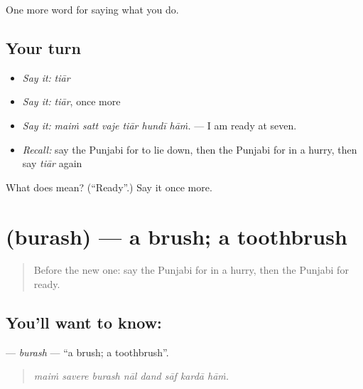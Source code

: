 \begin{grammarlens}[title={What you've built}]
One more word for saying what you do.
\end{grammarlens}

\subsection*{Your turn}
\begin{itemize}
\raggedright
  \item \emph{Say it:} \emph{tiār}
  \item \emph{Say it:} \emph{tiār}, once more
  \item \emph{Say it:} \emph{maiṁ satt vaje tiār hundī hāṁ.} — I am ready at seven.
  \item \emph{Recall:} say the Punjabi for to lie down, then the Punjabi for in a hurry, then say \emph{tiār} again
\end{itemize}

\begin{tcolorbox}[breakable,colback=teal!4,colframe=teal!35!black,title={Before you move on}]
What does  mean? (\textquotedblleft{}Ready\textquotedblright{}.) Say it once more.
\end{tcolorbox}
\section[\texorpdfstring{\pa{ਬੁਰਸ਼} (burash)}{ਬੁਰਸ਼ (burash)}]{ (burash) — a brush; a toothbrush}

\label{lesson:PA-C226-burash}



\begin{quote}
Before the new one: say the Punjabi for in a hurry, then the Punjabi for ready.
\end{quote}

\subsection*{You'll want to know: }
\textbf{} — \emph{burash} — \textquotedblleft{}a brush; a toothbrush\textquotedblright{}.

\begin{quote}
       
\end{quote}

\begin{quote}
\emph{maiṁ savere burash nāl dand sāf kardā hāṁ.}
\end{quote}

